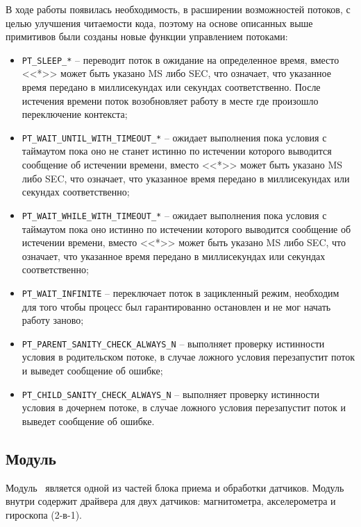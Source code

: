 В ходе работы появилась необходимость, в расширении возможностей потоков, с целью улучшения читаемости кода,
поэтому на основе описанных выше примитивов были созданы новые функции управлением потоками:

\begin{itemize}
    \item \lstinline{PT_SLEEP_*} -- переводит поток в ожидание на определенное время,
    вместо <<*>> может быть указано MS либо SEC, что означает, что указанное время передано в миллисекундах или секундах соответственно.
    После истечения времени поток возобновляет работу в месте где произошло переключение контекста;
    \item \lstinline{PT_WAIT_UNTIL_WITH_TIMEOUT_*} -- ожидает выполнения пока условия с таймаутом пока оно не станет истинно
    по истечении которого выводится сообщение об истечении времени, вместо <<*>> может быть указано MS либо SEC,
    что означает, что указанное время передано в миллисекундах или секундах соответственно;
    \item \lstinline{PT_WAIT_WHILE_WITH_TIMEOUT_*} -- ожидает выполнения пока условия с таймаутом пока оно истинно
    по истечении которого выводится сообщение об истечении времени, вместо <<*>> может быть указано MS либо SEC,
    что означает, что указанное время передано в миллисекундах или секундах соответственно;
    \item \lstinline{PT_WAIT_INFINITE} -- переключает поток в зацикленный режим, необходим для того чтобы процесс был гарантированно остановлен и не мог начать работу заново;
    \item \lstinline{PT_PARENT_SANITY_CHECK_ALWAYS_N} -- выполняет проверку истинности условия в родительском потоке,
    в случае ложного условия перезапустит поток и выведет сообщение об ошибке;
    \item \lstinline{PT_CHILD_SANITY_CHECK_ALWAYS_N} -- выполняет проверку истинности условия в дочернем потоке,
    в случае ложного условия перезапустит поток и выведет сообщение об ошибке.
\end{itemize}


\subsection{Модуль \modulePerifery}
Модуль \modulePerifery\ является одной из частей блока приема и обработки
датчиков. Модуль внутри содержит драйвера для двух датчиков: магнитометра, акселерометра и гироскопа (2-в-1).

